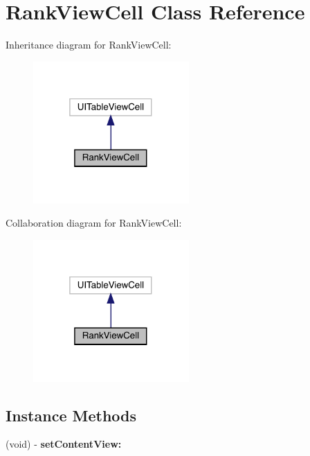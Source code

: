 \hypertarget{interface_rank_view_cell}{}\section{Rank\+View\+Cell Class Reference}
\label{interface_rank_view_cell}


Inheritance diagram for Rank\+View\+Cell\+:\nopagebreak
\begin{figure}[H]
\begin{center}
\leavevmode
\includegraphics[width=169pt]{interface_rank_view_cell__inherit__graph}
\end{center}
\end{figure}


Collaboration diagram for Rank\+View\+Cell\+:\nopagebreak
\begin{figure}[H]
\begin{center}
\leavevmode
\includegraphics[width=169pt]{interface_rank_view_cell__coll__graph}
\end{center}
\end{figure}
\subsection*{Instance Methods}
\begin{DoxyCompactItemize}
\item 
\mbox{\label{interface_rank_view_cell_a16dfaef759ac224c7dc284ae3f2f79ec}} 
(void) -\/ {\bfseries set\+Content\+View\+:}
\end{DoxyCompactItemize}
